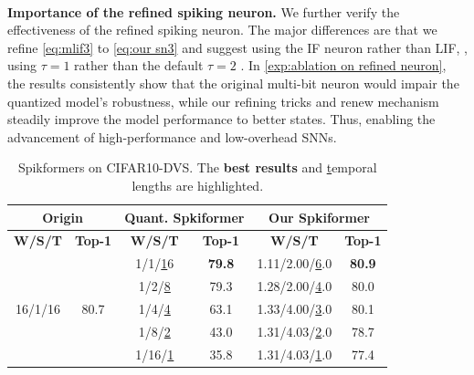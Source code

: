 \\\textbf{Importance of the refined spiking neuron.}
We further verify the effectiveness of the refined spiking neuron. The major differences are that we refine  \cref{eq:mlif3} to  \cref{eq:our sn3} and suggest using the IF neuron rather than LIF, \ie, using $\tau=1$ rather than the default $\tau=2$ \cite{fang2023spikingjelly}. In  \cref{exp:ablation on refined neuron}, the results consistently show that the original multi-bit neuron would impair the quantized model's robustness, while our refining tricks and renew mechanism steadily improve the model performance to better states. Thus, enabling the advancement of high-performance and low-overhead SNNs. 
\begin{table}[t]
\centering
\caption{Spikformers on CIFAR10-DVS. The \textbf{best results} and {\ul temporal lengths} are highlighted.}
\label{exp:ablations on dvs}
\begin{adjustbox}{max width=0.45\textwidth}
\begin{threeparttable}
\begin{tabular}{cc|cc|cc}
\hline
\multicolumn{2}{c|}{\textbf{Origin} \cite{shen2024conventional}}             & \multicolumn{2}{c|}{\textbf{Quant. Spkiformer} \cite{shen2024conventional}} & \multicolumn{2}{c}{\textbf{Our Spkiformer}} \\ \hline
\textbf{W/S/T}           & \textbf{Top-1}        & \textbf{W/S/T}      & \textbf{Top-1}      & \textbf{W/S/T}    & \textbf{Top-1}    \\ \hline
\multirow{5}{*}{16/1/16} & \multirow{5}{*}{80.7} & 1/1/{\ul16}             & \textbf{79.8}       & 1.11/2.00/{\ul6.0}     & \textbf{80.9}     \\
                         &                       & 1/2/{\ul8}             & 79.3                & 1.28/2.00/{\ul4.0}     & 80.0              \\
                         &                       & 1/4/{\ul4}            & 63.1                & 1.33/4.00/{\ul3.0}     & 80.1              \\
                         &                       & 1/8/{\ul2}            & 43.0                & 1.31/4.03/{\ul2.0}     & 78.7              \\
                         &                       & 1/16/{\ul1}          & 35.8                & 1.31/4.03/{\ul1.0}     & 77.4              \\ \hline
\end{tabular}
\end{threeparttable}
\end{adjustbox}
\end{table}
